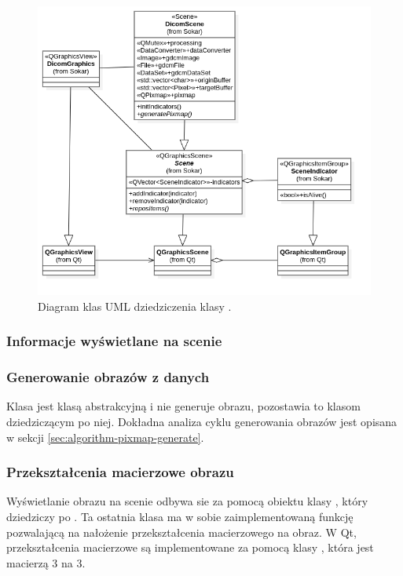 \begin{figure}[!htbp]
    \centering
    \includegraphics[width=\textwidth]{img/uml/dicom-scene-layers.png}
    \caption{Diagram klas UML dziedziczenia klasy .}
    \label{uml:sokar-scene-layers}
\end{figure}


\subsubsection{Informacje wyświetlane na scenie}


\subsubsection{Generowanie obrazów z danych}

Klasa  jest klasą abstrakcyjną i nie generuje obrazu, pozostawia to klasom dziedziczącym po niej.
Dokładna analiza cyklu generowania obrazów jest opisana w sekcji \ref{sec:algorithm-pixmap-generate}.

\subsubsection{Przekształcenia macierzowe obrazu}

\par
Wyświetlanie obrazu na scenie odbywa sie za pomocą obiektu klasy , który dziedziczy po .
Ta ostatnia klasa ma w sobie zaimplementowaną funkcję pozwalającą na nałożenie przekształcenia macierzowego na obraz.
W Qt, przekształcenia macierzowe są implementowane za pomocą klasy , która jest macierzą 3 na 3.

